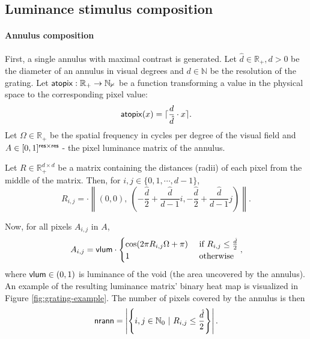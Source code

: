 \subsection{Luminance stimulus composition}

\paragraph{Annulus composition}

First, a single annulus with maximal contrast is generated. Let $\hat{d} \in \mathbb{R}_+, d > 0$ be the diameter of an annulus in visual degrees and $d \in \mathbb{N}$ be the resolution of the grating. Let $\mathsf{atopix}: \mathbb{R_+ \to \mathbb{N}_0}$ be a function transforming a value in the physical space to the corresponding pixel value:
\begin{equation}
    \mathsf{atopix}(x) = \lceil\frac{d}{\hat{d}} \cdot x\rceil.
\end{equation}
Let $\Omega \in \mathbb{R}_+$ be  the spatial frequency in cycles per degree of the visual field and $A \in [0, 1]^{\mathsf{res} \times \mathsf{res}}$ - the pixel luminance matrix of the annulus. 

Let $R \in \mathbb{R}_+^{d \times d}$ be a matrix containing the distances (radii) of each pixel from the middle of the matrix. Then, for $i, j \in \{ 0, 1, \cdots,  d-1 \}$,
\begin{equation}
    R_{i, j} = \cdot \left\| (0, 0), \ \left(-\frac{\hat{d}}{2} + \frac{\hat{d}}{d - 1} i, -\frac{\hat{d}}{2} + \frac{\hat{d}}{d - 1} j \right) \right\|.
\end{equation}

Now, for all pixels $A_{i, j}$ in $A$, 
\begin{equation}
    A_{i, j} = \mathsf{vlum} \cdot
    \begin{cases}
        \cos(2 \pi R_{i, j} \Omega + \pi) &\text{ if } R_{i, j} \leq \frac{\hat{d}}{2} \\
        1 &\text{ otherwise}
    \end{cases},
    \label{eq:grating}
\end{equation}
where $\mathsf{vlum} \in (0, 1)$ is luminance of the void (the area uncovered by the annulus).
An example of the resulting luminance matrix' binary heat map is visualized in Figure \ref{fig:grating-example}. The number of pixels covered by the annulus is then
\begin{equation}
    \mathsf{nrann} = \left| \left\{ i, j \in \mathbb{N}_0 \ | \ R_{i, j} \leq \frac{\hat{d}}{2} \right\} \right|.
\end{equation}

